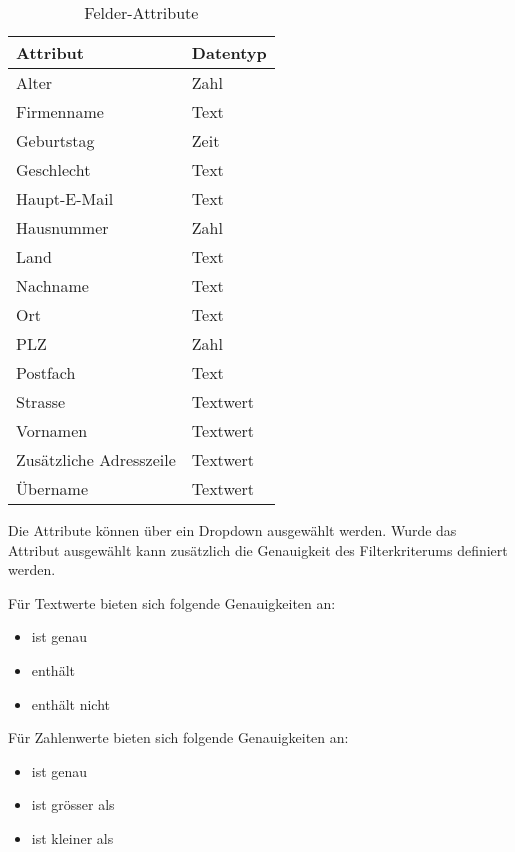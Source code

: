 \begin{table}[h!]
   \begin{tabular}{|L{0.5\textwidth}|L{0.5\textwidth}|}
       \hline
       \color{white}Attribut & \color{white}Datentyp \\
       \hline
       Alter & Zahl \\
       \hline
       Firmenname & Text \\
       \hline
       Geburtstag & Zeit \\
       \hline
       Geschlecht & Text \\
       \hline
       Haupt-E-Mail & Text \\
       \hline
       Hausnummer & Zahl \\
       \hline
       Land & Text \\
       \hline
       Nachname & Text \\
       \hline
       Ort & Text \\
       \hline
       PLZ & Zahl \\
       \hline
       Postfach & Text \\
       \hline
       Strasse & Textwert \\
       \hline
       Vornamen & Textwert \\
       \hline
       Zusätzliche Adresszeile & Textwert \\
       \hline
       Übername & Textwert \\
       \hline
     \end{tabular}
     \caption{Felder-Attribute}
\end{table}

Die Attribute können über ein Dropdown ausgewählt werden. Wurde das Attribut ausgewählt kann zusätzlich die Genauigkeit
des Filterkriterums definiert werden.

Für Textwerte bieten sich folgende Genauigkeiten an:

\begin{itemize}
   \item ist genau
   \item enthält
   \item enthält nicht
\end{itemize}

Für Zahlenwerte bieten sich folgende Genauigkeiten an:

\begin{itemize}
   \item ist genau
   \item ist grösser als
   \item ist kleiner als
\end{itemize}

